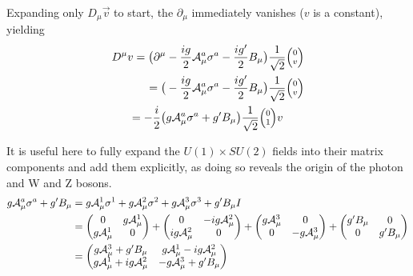         Expanding only $D_{\mu} \vec{v}$ to start, the $\partial_{\mu}$ immediately vanishes ($v$ is a constant), yielding 
        \begin{equation} \begin{split}
            D^{\mu} v  = \big( \partial^{\mu} & - \frac{ig}{2} \wField^a_{\mu} \sigma^a - \frac{ig'}{2} B_{\mu} \big) \frac{1}{\sqrt{2}}\minimatrix{0\\v} \\
            = \big( & - \frac{ig}{2} \wField^a_{\mu} \sigma^a - \frac{ig'}{2} B_{\mu} \big) \frac{1}{\sqrt{2}}\minimatrix{0\\v} \\
            = - \frac{i}{2} \big( & g \wField^a_{\mu} \sigma^a + g' B_{\mu} \big) \frac{1}{\sqrt{2}}\minimatrix{0\\1} v
        \end{split} \end{equation}

        It is useful here to fully expand the $U(1) \times SU(2)$ fields into their matrix components and add them explicitly,
            as doing so reveals the origin of the photon and W and Z bosons.
        \begin{equation} \begin{split}
            g \mathcal{A}^a_{\mu} \sigma^a + g' B_{\mu} & =
                g \mathcal{A}^1_{\mu} \sigma^1
                + g \mathcal{A}^2_{\mu} \sigma^2
                + g \mathcal{A}^3_{\mu} \sigma^3
                + g' B_{\mu} I \\
            & = \begin{pmatrix}
                0 & g\mathcal{A}^1_{\mu} \\ g\mathcal{A}^1_{\mu} & 0 \end{pmatrix}
                + \begin{pmatrix} 0 & -ig\mathcal{A}^2_{\mu} \\ ig\mathcal{A}^2_{\mu} & 0 \end{pmatrix}
                + \begin{pmatrix} g\mathcal{A}^3_{\mu} & 0 \\ 0 & -g\mathcal{A}^3_{\mu} \end{pmatrix}
                + \begin{pmatrix} g'B_{\mu} & 0 \\ 0 & g'B_{\mu}
            \end{pmatrix} \\
            & = \begin{pmatrix} 
                g\mathcal{A}^3_{\mu} + g'B_{\mu} & g\mathcal{A}^1_{\mu} - ig\mathcal{A}^2_{\mu} \\
                g\mathcal{A}^1_{\mu} + ig\mathcal{A}^2_{\mu} & -g\mathcal{A}^3_{\mu} + g'B_{\mu}
            \end{pmatrix}
        \end{split} \end{equation}

